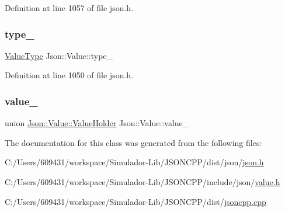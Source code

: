 Definition at line 1057 of file json.\+h.

\hypertarget{class_json_1_1_value_abd222c2536dc88bf330dedcd076d2356}{}\label{class_json_1_1_value_abd222c2536dc88bf330dedcd076d2356} 
\subsubsection{\texorpdfstring{type\+\_\+}{type\_}}
{\footnotesize\ttfamily \hyperlink{namespace_json_a7d654b75c16a57007925868e38212b4e}{Value\+Type} Json\+::\+Value\+::type\+\_\+\hspace{0.3cm}{\ttfamily [private]}}



Definition at line 1050 of file json.\+h.

\hypertarget{class_json_1_1_value_a692277d820a4750e01354e16a465ecfe}{}\label{class_json_1_1_value_a692277d820a4750e01354e16a465ecfe} 
\subsubsection{\texorpdfstring{value\+\_\+}{value\_}}
{\footnotesize\ttfamily union \hyperlink{union_json_1_1_value_1_1_value_holder}{Json\+::\+Value\+::\+Value\+Holder} Json\+::\+Value\+::value\+\_\+\hspace{0.3cm}{\ttfamily [private]}}



The documentation for this class was generated from the following files\+:\begin{DoxyCompactItemize}
\item 
C\+:/\+Users/609431/workspace/\+Simulador-\/\+Lib/\+J\+S\+O\+N\+C\+P\+P/dist/json/\hyperlink{dist_2json_2json_8h}{json.\+h}\item 
C\+:/\+Users/609431/workspace/\+Simulador-\/\+Lib/\+J\+S\+O\+N\+C\+P\+P/include/json/\hyperlink{value_8h}{value.\+h}\item 
C\+:/\+Users/609431/workspace/\+Simulador-\/\+Lib/\+J\+S\+O\+N\+C\+P\+P/dist/\hyperlink{jsoncpp_8cpp}{jsoncpp.\+cpp}\end{DoxyCompactItemize}
